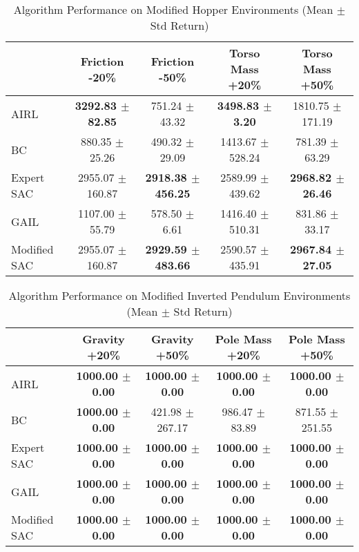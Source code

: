 \documentclass{article}
\begin{document}

\begin{table}
\caption{Algorithm Performance on Modified Hopper Environments (Mean $\pm$ Std Return)}
\label{tab:perf_mod_hopper}
\begin{adjustbox}{max width=\textwidth, center}
\begin{tabular}{lcccc}
\toprule
 & Friction -20\% & Friction -50\% & Torso Mass +20\% & Torso Mass +50\% \\
\midrule
AIRL & \textbf{3292.83 $\pm$ 82.85} & 751.24 $\pm$ 43.32 & \textbf{3498.83 $\pm$ 3.20} & 1810.75 $\pm$ 171.19 \\
BC & 880.35 $\pm$ 25.26 & 490.32 $\pm$ 29.09 & 1413.67 $\pm$ 528.24 & 781.39 $\pm$ 63.29 \\
Expert SAC & 2955.07 $\pm$ 160.87 & \textbf{2918.38 $\pm$ 456.25} & 2589.99 $\pm$ 439.62 & \textbf{2968.82 $\pm$ 26.46} \\
GAIL & 1107.00 $\pm$ 55.79 & 578.50 $\pm$ 6.61 & 1416.40 $\pm$ 510.31 & 831.86 $\pm$ 33.17 \\
Modified SAC & 2955.07 $\pm$ 160.87 & \textbf{2929.59 $\pm$ 483.66} & 2590.57 $\pm$ 435.91 & \textbf{2967.84 $\pm$ 27.05} \\
\bottomrule
\end{tabular}
\end{adjustbox}
\end{table}



\begin{table}
\caption{Algorithm Performance on Modified Inverted Pendulum Environments (Mean $\pm$ Std Return)}
\label{tab:perf_mod_invpend}
\begin{adjustbox}{max width=\textwidth, center}
\begin{tabular}{lcccc}
\toprule
 & Gravity +20\% & Gravity +50\% & Pole Mass +20\% & Pole Mass +50\% \\
\midrule
AIRL & \textbf{1000.00 $\pm$ 0.00} & \textbf{1000.00 $\pm$ 0.00} & \textbf{1000.00 $\pm$ 0.00} & \textbf{1000.00 $\pm$ 0.00} \\
BC & \textbf{1000.00 $\pm$ 0.00} & 421.98 $\pm$ 267.17 & 986.47 $\pm$ 83.89 & 871.55 $\pm$ 251.55 \\
Expert SAC & \textbf{1000.00 $\pm$ 0.00} & \textbf{1000.00 $\pm$ 0.00} & \textbf{1000.00 $\pm$ 0.00} & \textbf{1000.00 $\pm$ 0.00} \\
GAIL & \textbf{1000.00 $\pm$ 0.00} & \textbf{1000.00 $\pm$ 0.00} & \textbf{1000.00 $\pm$ 0.00} & \textbf{1000.00 $\pm$ 0.00} \\
Modified SAC & \textbf{1000.00 $\pm$ 0.00} & \textbf{1000.00 $\pm$ 0.00} & \textbf{1000.00 $\pm$ 0.00} & \textbf{1000.00 $\pm$ 0.00} \\
\bottomrule
\end{tabular}
\end{adjustbox}
\end{table}
\end{document}
